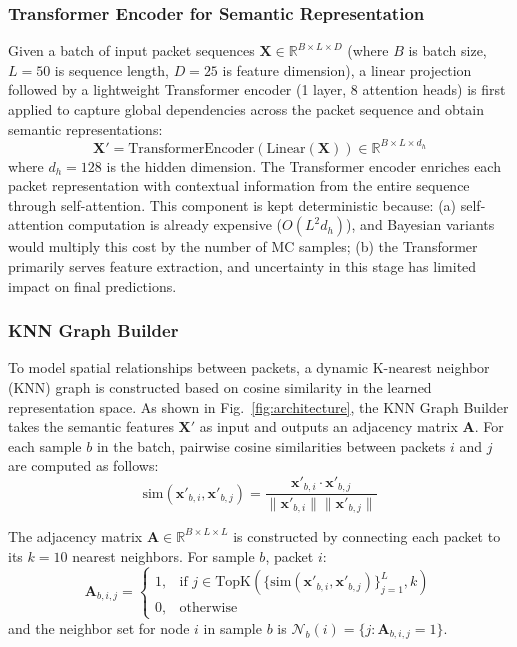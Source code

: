 \documentclass[lettersize,journal]{IEEEtran}
\begin{document}
\subsubsection{Transformer Encoder for Semantic Representation}

Given a batch of input packet sequences $\mathbf{X} \in \mathbb{R}^{B \times L \times D}$ (where $B$ is batch size, $L=50$ is sequence length, $D=25$ is feature dimension), a linear projection followed by a lightweight Transformer encoder (1 layer, 8 attention heads) is first applied to capture global dependencies across the packet sequence and obtain semantic representations:
\begin{equation}
\mathbf{X}' = \text{TransformerEncoder}(\text{Linear}(\mathbf{X})) \in \mathbb{R}^{B \times L \times d_h}
\end{equation}
where $d_h=128$ is the hidden dimension. The Transformer encoder enriches each packet representation with contextual information from the entire sequence through self-attention. This component is kept deterministic because: (a) self-attention computation is already expensive ($O(L^2 d_h)$), and Bayesian variants would multiply this cost by the number of MC samples; (b) the Transformer primarily serves feature extraction, and uncertainty in this stage has limited impact on final predictions.

\subsubsection{KNN Graph Builder}

To model spatial relationships between packets, a dynamic K-nearest neighbor (KNN) graph is constructed based on cosine similarity in the learned representation space. As shown in Fig.~\ref{fig:architecture}, the KNN Graph Builder takes the semantic features $\mathbf{X}'$ as input and outputs an adjacency matrix $\mathbf{A}$. For each sample $b$ in the batch, pairwise cosine similarities between packets $i$ and $j$ are computed as follows:
\begin{equation}
\text{sim}(\mathbf{x}'_{b,i}, \mathbf{x}'_{b,j}) = \frac{\mathbf{x}'_{b,i} \cdot \mathbf{x}'_{b,j}}{\|\mathbf{x}'_{b,i}\| \|\mathbf{x}'_{b,j}\|}
\end{equation}

The adjacency matrix $\mathbf{A} \in \mathbb{R}^{B \times L \times L}$ is constructed by connecting each packet to its $k=10$ nearest neighbors. For sample $b$, packet $i$:
\begin{equation}
\mathbf{A}_{b,i,j} = \begin{cases}
1, & \text{if } j \in \text{TopK}(\{\text{sim}(\mathbf{x}'_{b,i}, \mathbf{x}'_{b,j})\}_{j=1}^L, k) \\
0, & \text{otherwise}
\end{cases}
\end{equation}
and the neighbor set for node $i$ in sample $b$ is $\mathcal{N}_b(i)=\{j:\mathbf{A}_{b,i,j}=1\}$.
\end{document}
